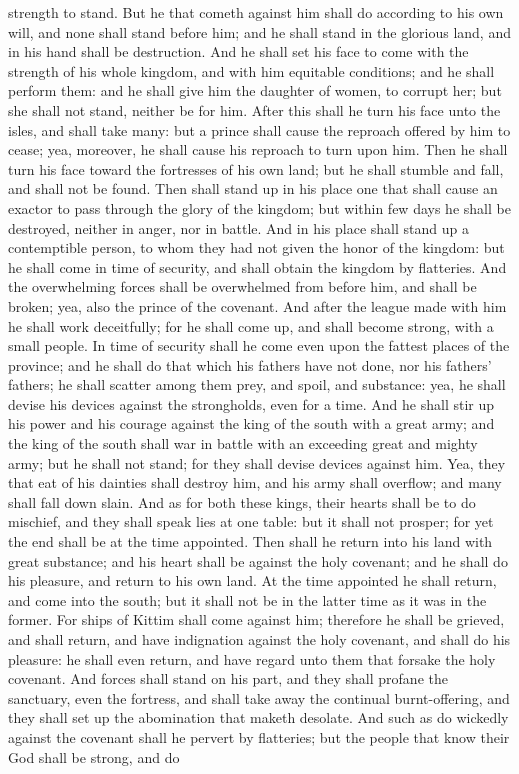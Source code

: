 strength to stand. But he that cometh against him shall do according to his own will, and none shall stand before him; and he shall stand in the glorious land, and in his hand shall be destruction. And he shall set his face to come with the strength of his whole kingdom, and with him equitable conditions; and he shall perform them: and he shall give him the daughter of women, to corrupt her; but she shall not stand, neither be for him. After this shall he turn his face unto the isles, and shall take many: but a prince shall cause the reproach offered by him to cease; yea, moreover, he shall cause his reproach to turn upon him. Then he shall turn his face toward the fortresses of his own land; but he shall stumble and fall, and shall not be found.  Then shall stand up in his place one that shall cause an exactor to pass through the glory of the kingdom; but within few days he shall be destroyed, neither in anger, nor in battle. And in his place shall stand up a contemptible person, to whom they had not given the honor of the kingdom: but he shall come in time of security, and shall obtain the kingdom by flatteries. And the overwhelming forces shall be overwhelmed from before him, and shall be broken; yea, also the prince of the covenant. And after the league made with him he shall work deceitfully; for he shall come up, and shall become strong, with a small people. In time of security shall he come even upon the fattest places of the province; and he shall do that which his fathers have not done, nor his fathers’ fathers; he shall scatter among them prey, and spoil, and substance: yea, he shall devise his devices against the strongholds, even for a time. And he shall stir up his power and his courage against the king of the south with a great army; and the king of the south shall war in battle with an exceeding great and mighty army; but he shall not stand; for they shall devise devices against him. Yea, they that eat of his dainties shall destroy him, and his army shall overflow; and many shall fall down slain. And as for both these kings, their hearts shall be to do mischief, and they shall speak lies at one table: but it shall not prosper; for yet the end shall be at the time appointed.  Then shall he return into his land with great substance; and his heart shall be against the holy covenant; and he shall do his pleasure, and return to his own land. At the time appointed he shall return, and come into the south; but it shall not be in the latter time as it was in the former. For ships of Kittim shall come against him; therefore he shall be grieved, and shall return, and have indignation against the holy covenant, and shall do his pleasure: he shall even return, and have regard unto them that forsake the holy covenant. And forces shall stand on his part, and they shall profane the sanctuary, even the fortress, and shall take away the continual burnt-offering, and they shall set up the abomination that maketh desolate. And such as do wickedly against the covenant shall he pervert by flatteries; but the people that know their God shall be strong, and do 